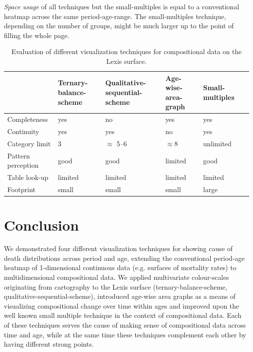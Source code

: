 \documentclass[a4paper]{scrartcl}
\newcommand{\tabformat}{\small\centering}
\begin{document}
\emph{Space usage} of all techniques but the small-multiples is equal to a conventional heatmap across the same period-age-range. The small-multiples technique, depending on the number of groups, might be much larger up to the point of filling the whole page.

\begin{table}[!htb]
\tabformat
\begin{tabular}{p{3.5cm}*5{Q{1.5cm}}}
\toprule
 & Ternary-balance-scheme & Qualitative-sequential-scheme & Age-wise-area-graph & Small-multiples \\
\midrule
Completeness & yes & no & yes & yes \\
Continuity & yes & yes & no & yes \\
Category limit & 3 & $\approx$ 5--6 & $\approx 8$ & unlimited \\
Pattern perception & good & good & limited & good \\
Table look-up & limited & limited & limited & limited \\
Footprint & small & small & small & large \\
\bottomrule
\end{tabular}
\caption{Evaluation of different visualization techniques for compositional data on the Lexis surface.}
\label{tab:eval}
\end{table}

\section*{Conclusion}

We demonstrated four different visualization techniques for showing cause of death distributions across period and age, extending the conventional period-age heatmap of 1-dimensional continuous data (e.g. surfaces of mortality rates) to multidimensional compositional data. We applied multivariate colour-scales originating from cartography to the Lexis surface (ternary-balance-scheme, qualitative-sequential-scheme), introduced age-wise area graphs as a means of visualizing compositional change over time within ages and improved upon the well known small multiple technique in the context of compositional data. Each of these techniques serves the cause of making sense of compositional data across time and age, while at the same time these techniques complement each other by having different strong points.
\end{document}
